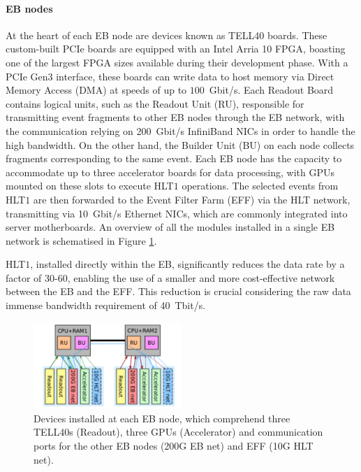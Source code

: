 \paragraph{EB nodes}
At the heart of each EB node are devices known as TELL40 boards. These custom-built PCIe boards are equipped with an Intel Arria 10 FPGA, boasting one of the largest FPGA sizes available during their development phase. With a PCIe Gen3 interface, these boards can write data to host memory via Direct Memory Access (DMA) at speeds of up to $100$~Gbit/s. Each Readout Board contains logical units, such as the Readout Unit (RU), responsible for transmitting event fragments to other EB nodes through the EB network, with the communication relying on 200~Gbit/s InfiniBand NICs in order to handle the high bandwidth. On the other hand, the Builder Unit (BU) on each node collects fragments corresponding to the same event. Each EB node has the capacity to accommodate up to three accelerator boards for data processing, with GPUs mounted on these slots to execute HLT$1$ operations. The selected events from HLT$1$ are then forwarded to the Event Filter Farm (EFF) via the HLT network, transmitting via 10~Gbit/s Ethernet NICs, which are commonly integrated into server motherboards. An overview of all the modules installed in a single EB network is schematised in Figure \ref{devices_EBnode}.

HLT$1$, installed directly within the EB, significantly reduces the data rate by a factor of 30-60, enabling the use of a smaller and more cost-effective network between the EB and the EFF. This reduction is crucial considering the raw data immense bandwidth requirement of 40~Tbit/s.

\begin{figure}
\centering
    \includegraphics[width=0.5\textwidth]{figures/zoom_EB_node.png}
    \caption{Devices installed at each EB node, which comprehend three TELL40s (Readout), three GPUs (Accelerator) and communication ports for the other EB nodes (200G EB net) and EFF (10G HLT net).}\label{devices_EBnode}
\end{figure}

